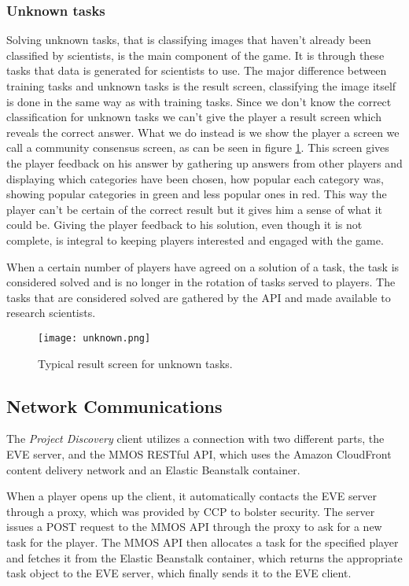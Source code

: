 \subsubsection{Unknown tasks}
Solving unknown tasks, that is classifying images that haven't already been classified by scientists, is the main component of the game. It is through these tasks that data is generated for scientists to use. The major difference between training tasks and unknown tasks is the result screen, classifying the image itself is done in the same way as with training tasks. Since we don't know the correct classification for unknown tasks we can't give the player a result screen which reveals the correct answer. What we do instead is we show the player a screen we call a community consensus screen, as can be seen in figure \ref{fig:unknown}. This screen gives the player feedback on his answer by gathering up answers from other players and displaying which categories have been chosen, how popular each category was, showing popular categories in green and less popular ones in red. This way the player can't be certain of the correct result but it gives him a sense of what it could be. Giving the player feedback to his solution, even though it is not complete, is integral to keeping players interested and engaged with the game.

When a certain number of players have agreed on a solution of a task, the task is considered solved and is no longer in the rotation of tasks served to players. The tasks that are considered solved are gathered by the API and made available to research scientists.

\begin{figure}[H]
\centering
\graphicspath{ {./graphics/} }
\centerline{\texttt{[image: unknown.png]}}
\caption{\label{fig:unknown} Typical result screen for unknown tasks.}
\end{figure}

\subsection{Network Communications}
The \emph{Project Discovery} client utilizes a connection with two different parts, the EVE server, and the MMOS RESTful API, which uses the Amazon CloudFront content delivery network and an Elastic Beanstalk container.

When a player opens up the client, it automatically contacts the EVE server through a proxy, which was provided by CCP to bolster security. The server issues a POST request to the MMOS API through the proxy to ask for a new task for the player. The MMOS API then allocates a task for the specified player and fetches it from the Elastic Beanstalk container, which returns the appropriate task object to the EVE server, which finally sends it to the EVE client. 


